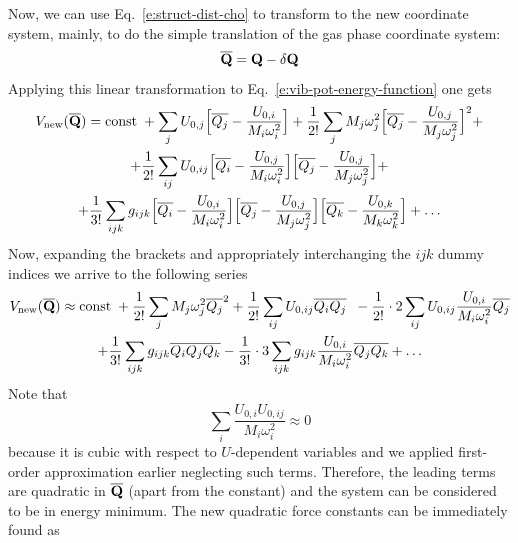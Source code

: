 \documentclass[a4paper,titlepage,twoside,fleqn,12pt]{book}
\begin{document}
\begin{refsection}
Now, we can use Eq.~\eqref{e:struct-dist-cho} to transform to the new coordinate system, mainly,
to do the simple translation of the gas phase coordinate system:
%
\begin{equation} \label{e:struct-dist-cho-transl}
\overline{\bf Q} = {\bf Q} - \delta {\bf Q}
\end{equation}
%
Applying this linear transformation to Eq.~\eqref{e:vib-pot-energy-function} one gets
%
\begin{multline}\label{exp}
V_{\rm new}(\overline{\bf Q}) = {\rm const}\;+\sum_j U_{0,j}\Big[\overline{Q_j}-\frac{U_{0,i}}{M_i\omega_i^2}\Big]
+ \frac{1}{2!} \sum_j M_j \omega_j^2 \Big[\overline{Q_j} - \frac{U_{0,j}}{M_j\omega_j^2}\Big]^2  +  \\
+ \frac{1}{2!} \sum_{ij} U_{0,ij} \Big[\overline{Q_i} - \frac{U_{0,j}}{M_i\omega_i^2}\Big] 
\Big[\overline{Q_j} - \frac{U_{0,j}}{M_j\omega_j^2}\Big] +  \\
+ \frac{1}{3!} \sum_{ijk} g_{ijk}  
\Big[\overline{Q_i} - \frac{U_{0,i}}{M_i\omega_i^2}\Big]
\Big[\overline{Q_j} - \frac{U_{0,j}}{M_j\omega_j^2}\Big]
\Big[\overline{Q_k} - \frac{U_{0,k}}{M_k\omega_k^2}\Big]  
+ \ldots
\end{multline}
%
Now, expanding the brackets and
appropriately interchanging the $ijk$ dummy indices we arrive to the following
series
%
\begin{multline}\label{exp2}
V_{\rm new}(\overline{\bf Q}) \approx {\rm const}\; 
+ \frac{1}{2!} \sum_j M_j \omega_j^2 \overline{Q_j}^2 
+ \frac{1}{2!} \sum_{ij} U_{0,ij} \overline{Q_i} \overline{Q_j} \;\;
 - \frac{1}{2!} \cdot 2 \sum_{ij} U_{0,ij} \frac{U_{0,i}}{M_i\omega_i^2} \overline{Q_j} \\
+ \frac{1}{3!} \sum_{ijk} g_{ijk} \overline{Q_i}\overline{Q_j}\overline{Q_k}  
- \frac{1}{3!} \cdot 3\sum_{ijk} g_{ijk} \frac{U_{0,i}}{M_i\omega_i^2} \overline{Q_j}\overline{Q_k} 
+ \ldots
\end{multline}
%
Note that
%
\begin{equation}
\sum_i \frac{ U_{0,i} U_{0,ij} }{M_i\omega_i^2}  \approx 0
\end{equation}
%
because it is cubic with respect to $U$\hyp{}dependent variables and we
applied first\hyp{}order approximation earlier neglecting such terms. 
Therefore, the leading terms are quadratic in $\overline{\bf Q}$
(apart from the constant) and the system can be considered to be in energy minimum.
The new quadratic force constants can be immediately found as
%
\begin{equation} \label{e:force-const-cho}

\end{equation}
\end{refsection}
\end{document}
